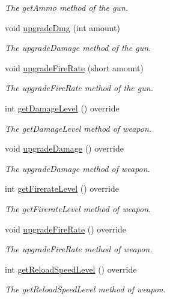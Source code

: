 \begin{DoxyCompactItemize}
\begin{DoxyCompactList}\small\item\em The get\+Ammo method of the gun. \end{DoxyCompactList}\item 
void \hyperlink{class_gun_aa35ec2c6dff5d0d2e5392f98c74e86e5}{upgrade\+Dmg} (int amount)
\begin{DoxyCompactList}\small\item\em The upgrade\+Damage method of the gun. \end{DoxyCompactList}\item 
void \hyperlink{class_gun_a7db78488abab127b3fceefd56c9b2de6}{upgrade\+Fire\+Rate} (short amount)
\begin{DoxyCompactList}\small\item\em The upgrade\+Fire\+Rate method of the gun. \end{DoxyCompactList}\item 
int \hyperlink{class_gun_a390b808f9094e07df029b8938749df28}{get\+Damage\+Level} () override
\begin{DoxyCompactList}\small\item\em The get\+Damage\+Level method of weapon. \end{DoxyCompactList}\item 
void \hyperlink{class_gun_a0d4270857233543d7c326995f746e27a}{upgrade\+Damage} () override
\begin{DoxyCompactList}\small\item\em The upgrade\+Damage method of weapon. \end{DoxyCompactList}\item 
int \hyperlink{class_gun_a9a7483bdcb239a4039ac2100e9794956}{get\+Firerate\+Level} () override
\begin{DoxyCompactList}\small\item\em The get\+Firerate\+Level method of weapon. \end{DoxyCompactList}\item 
void \hyperlink{class_gun_a0a5fa9346fbaa59e60d0f0a16e64ab11}{upgrade\+Fire\+Rate} () override
\begin{DoxyCompactList}\small\item\em The upgrade\+Fire\+Rate method of weapon. \end{DoxyCompactList}\item 
int \hyperlink{class_gun_aa4625cb9f717925e0416d38ae02db057}{get\+Reload\+Speed\+Level} () override
\begin{DoxyCompactList}\small\item\em The get\+Reload\+Speed\+Level method of weapon. \end{DoxyCompactList}\item 

\end{DoxyCompactItemize}
